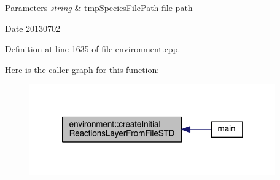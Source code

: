 \begin{DoxyParams}{Parameters}
{\em string} & tmp\+Species\+File\+Path file path \\
\hline
\end{DoxyParams}
\begin{DoxyDate}{Date}
20130702 
\end{DoxyDate}


Definition at line 1635 of file environment.\+cpp.



Here is the caller graph for this function\+:\nopagebreak
\begin{figure}[H]
\begin{center}
\leavevmode
\includegraphics[width=300pt]{a00013_a2f181e0d3ad1e8062ba0a8c9358ebc58_icgraph}
\end{center}
\end{figure}


